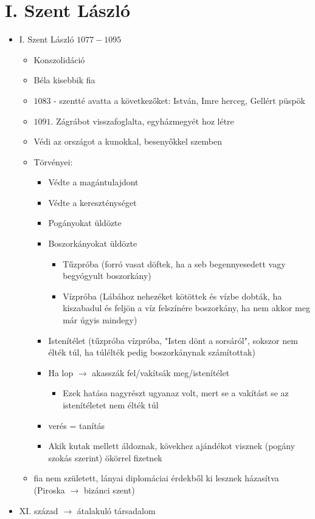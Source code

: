 \documentclass{article}
\begin{document}
\section{I. Szent László}
\begin{itemize}
    \item I. Szent László $1077-1095$
    \begin{itemize}
        \item Konszolidáció
        \item Béla kisebbik fia
        \item $1083$ - szentté avatta a következőket: István, Imre herceg, Gellért püspök
        \item $1091.$ Zágrábot visszafoglalta, egyházmegyét hoz létre
        \item Védi az országot a kunokkal, besenyőkkel szemben
        \item Törvényei: 
        \begin{itemize}
            \item Védte a magántulajdont
            \item Védte a kereszténységet
            \item Pogányokat üldözte
            \item Boszorkányokat üldözte 
            \begin{itemize}
                \item Tűzpróba (forró vasat döftek, ha a seb begennyesedett vagy begyógyult boszorkány)
                \item Vízpróba (Lábához nehezéket kötöttek és vízbe dobták, ha kiszabadul és feljön a víz felszínére boszorkány, ha nem akkor meg már úgyis mindegy)
            \end{itemize}
            \item Istenítélet (tűzpróba vízpróba, "Isten dönt a sorsáról", sokszor nem élték túl, ha túlélték pedig boszorkánynak számítottak)
            \item Ha lop $\rightarrow$ akasszák fel/vakítsák meg/istenítélet \begin{itemize}
                \item Ezek hatása nagyrészt ugyanaz volt, mert se a vakítást se az istenítéletet nem élték túl
            \end{itemize}
            \item verés = tanítás
            \item Akik kutak mellett áldoznak, kövekhez ajándékot visznek (pogány szokás szerint) ökörrel fizetnek
        \end{itemize}
        \item fia nem született, lányai diplomáciai érdekből ki lesznek házasítva (Piroska $\rightarrow$ bizánci szent)
    \end{itemize}
    \item XI. század $\rightarrow$ átalakuló társadalom


\end{itemize}
\end{document}
